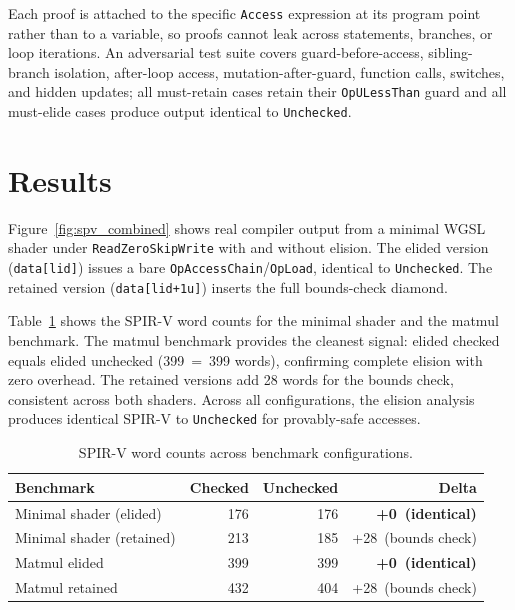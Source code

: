 \documentclass[11pt,a4paper]{article}
\begin{document}
Each proof is attached to the specific \texttt{Access} expression at its
program point rather than to a variable, so proofs cannot leak across
statements, branches, or loop iterations. An adversarial test suite covers
guard-before-access, sibling-branch isolation, after-loop access,
mutation-after-guard, function calls, switches, and hidden updates; all
must-retain cases retain their \texttt{OpULessThan} guard and all
must-elide cases produce output identical to \texttt{Unchecked}.

\section{Results}
\label{sec:results}

Figure~\ref{fig:spv_combined} shows real compiler
output from a minimal WGSL shader under \texttt{ReadZeroSkipWrite} with and
without elision. The elided version (\texttt{data[lid]}) issues a bare
\texttt{OpAccessChain}/\texttt{OpLoad}, identical to \texttt{Unchecked}. The
retained version (\texttt{data[lid+1u]}) inserts the full bounds-check
diamond.

Table~\ref{tab:words} shows the SPIR-V word counts for the minimal shader
and the matmul benchmark. The matmul benchmark provides the cleanest signal:
elided checked equals elided unchecked (399~=~399 words), confirming complete
elision with zero overhead. The retained versions add 28 words for the bounds
check, consistent across both shaders. Across all configurations, the elision
analysis produces identical SPIR-V to \texttt{Unchecked} for provably-safe
accesses.

\begin{table}[htbp]
\centering
\caption{SPIR-V word counts across benchmark configurations.}
\label{tab:words}
\small
\begin{tabular}{lrrr}
\toprule
Benchmark & Checked & Unchecked & Delta \\
\midrule
Minimal shader (elided)   & 176 & 176 & \textbf{+0~(identical)} \\
Minimal shader (retained) & 213 & 185 & +28~(bounds check) \\
Matmul elided             & 399 & 399 & \textbf{+0~(identical)} \\
Matmul retained           & 432 & 404 & +28~(bounds check) \\
\bottomrule
\end{tabular}
\end{table}
\end{document}

